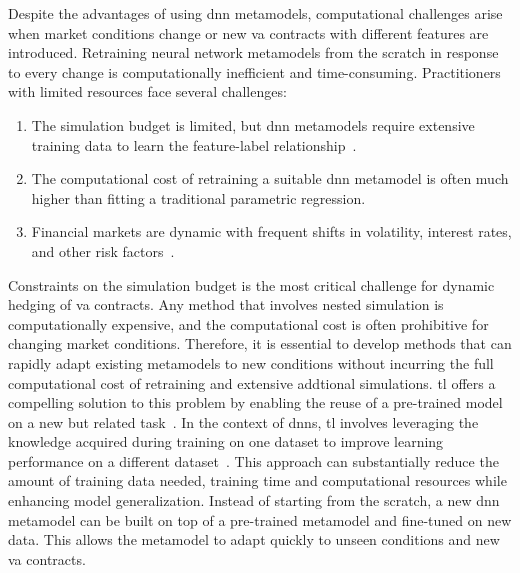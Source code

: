 Despite the advantages of using \gls{dnn} metamodels, computational challenges arise when market conditions change or new \gls{va} contracts with different features are introduced. 
Retraining neural network metamodels from the scratch in response to every change is computationally inefficient and time-consuming.
Practitioners with limited resources face several challenges:
\begin{enumerate}
    \item The simulation budget is limited, but \gls{dnn} metamodels require extensive training data to learn the feature-label relationship~\citep{golestaneh2024many}. 
    \item The computational cost of retraining a suitable \gls{dnn} metamodel is often much higher than fitting a traditional parametric regression.
    \item Financial markets are dynamic with frequent shifts in volatility, interest rates, and other risk factors~\citep{cont2001empirical}.
\end{enumerate}

Constraints on the simulation budget is the most critical challenge for dynamic hedging of \gls{va} contracts.
Any method that involves nested simulation is computationally expensive, and the computational cost is often prohibitive for changing market conditions.
Therefore, it is essential to develop methods that can rapidly adapt existing metamodels to new conditions without incurring the full computational cost of retraining and extensive addtional simulations.
\gls{tl} offers a compelling solution to this problem by enabling the reuse of a pre-trained model on a new but related task~\citep{pan2009survey}.
In the context of \gls{dnn}s, \gls{tl} involves leveraging the knowledge acquired during training on one dataset to improve learning performance on a different dataset~\citep{yosinski2014transferable}.
This approach can substantially reduce the amount of training data needed, training time and computational resources while enhancing model generalization.
Instead of starting from the scratch, a new \gls{dnn} metamodel can be built on top of a pre-trained metamodel and fine-tuned on new data.
This allows the metamodel to adapt quickly to unseen conditions and new \gls{va} contracts.

